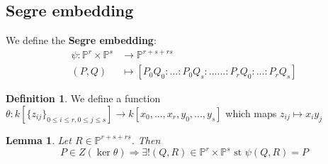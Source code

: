 \documentclass[12pt]{article}
\theoremstyle{plain}
\newtheorem{lemma}[thm]{Lemma}
\theoremstyle{definition}
\newtheorem{defn}[thm]{Definition} %
\newcommand{\bb}[1]{\mathbb{#1}}
\newcommand{\lto}{\longrightarrow}
\begin{document}
\subsection{Segre embedding}
We define the \textbf{Segre embedding}:
\begin{align*}
    \psi: \bb{P}^r \times \bb{P}^s &\lto \bb{P}^{r + s + rs}\\
    (P,Q) &\longmapsto [P_0Q_0:...:P_0Q_s:......:P_rQ_0:...:P_rQ_s]
\end{align*}
\begin{defn}
We define a function $\theta: k[\lbrace z_{ij}\rbrace_{0 \leq i \leq r, 0 \leq j \leq s}] \lto k[x_0,...,x_r,y_0,...,y_s]$ which maps $z_{ij} \longmapsto x_iy_j$
\end{defn}
\begin{lemma}\label{lem:theta_unique_existence}
Let $R \in \bb{P}^{r + s + rs}$. Then
\begin{equation}
    P \in Z(\operatorname{ker}\theta) \Longrightarrow \exists ! (Q,R) \in \bb{P}^r \times \bb{P}^s\text{ st }\psi(Q,R) = P
\end{equation}
\end{lemma}
\end{document}
